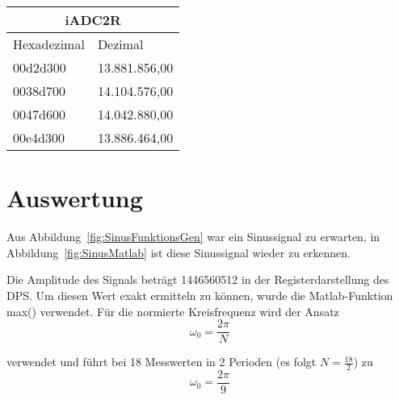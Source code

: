 \begin{center}
    \begin{tabular}{ | l | l | }\hline
      \multicolumn{2}{|c|}{iADC2R}\\
    \hline
    Hexadezimal & Dezimal \\ \hline
    00d2d300 &	13.881.856,00 \\ \hline
    0038d700 &	14.104.576,00 \\ \hline
    0047d600 &	14.042.880,00 \\ \hline
    00e4d300 &	13.886.464,00 \\ 
    \hline
    \end{tabular}
\end{center}



\section{Auswertung}
Aus Abbildung~\ref{fig:SinusFunktionsGen} war ein Sinussignal zu erwarten, in Abbildung~\ref{fig:SinusMatlab} ist diese Sinussignal wieder zu erkennen.\\\par
Die Amplitude des Signals beträgt 1446560512 in der Registerdarstellung des DPS. Um diesen Wert exakt ermitteln zu können, wurde die Matlab-Funktion max() 
verwendet.
Für die normierte Kreisfrequenz wird der Ansatz 
\begin{equation}\label{normierteKreisfrequenz}
 \omega_0=\frac{2\pi}N 
\end{equation}  

verwendet und führt bei 18 Messwerten in 2 Perioden (es folgt \begin{math}N=\frac{18}{2}\end{math}) zu 
\begin{equation*}
 \omega_0=\frac{2\pi}9 
\end{equation*}

